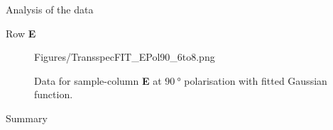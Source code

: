 \documentclass[pdftex, a4paper,11pt, twoside, UKenglish]{report}
\begin{document}
\begin{chapter}{Analysis of the data}
\begin{section}{Row \textbf{E}}
\begin{figure}[ht!]
\begin{minipage}{.95\textwidth}
              {Figures/TransspecFIT_EPol90_6to8.png}
          \caption{Data for sample-column \textbf{E} at $\SI{90}{\degree}$
              polarisation with fitted Gaussian function.}
          \label{fig:TransspecFIT_EPol90_6to8}
        \end{minipage}
      \end{figure}
      
    \end{section}
    
    
    
    \begin{section}{Summary}
      \label{chp:AnalysisSummary}
      
      
      
    \end{section}
   
  \end{chapter}
  
  
  
  
  
  
  
  \begin{thebibliography}{99}
    \scriptsize
    
  \end{thebibliography}
 
\end{document}
